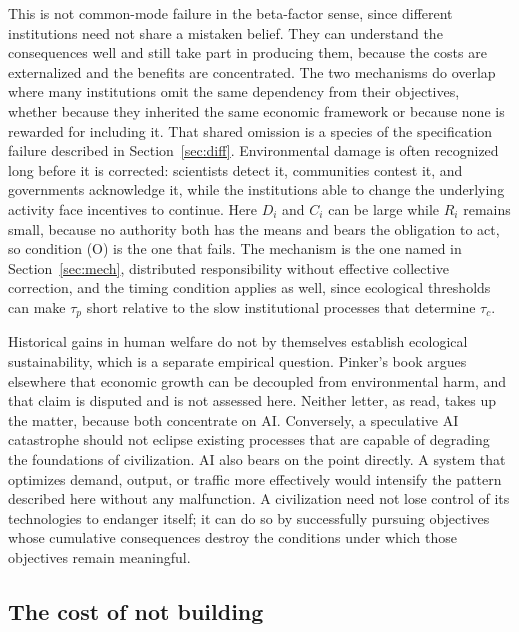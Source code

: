 \documentclass[11pt]{article}
\begin{document}
This is not common-mode failure in the beta-factor sense, since different institutions need not share a mistaken belief. They can understand the consequences well and still take part in producing them, because the costs are externalized and the benefits are concentrated. The two mechanisms do overlap where many institutions omit the same dependency from their objectives, whether because they inherited the same economic framework or because none is rewarded for including it. That shared omission is a species of the specification failure described in Section~\ref{sec:diff}. Environmental damage is often recognized long before it is corrected: scientists detect it, communities contest it, and governments acknowledge it, while the institutions able to change the underlying activity face incentives to continue. Here $D_i$ and $C_i$ can be large while $R_i$ remains small, because no authority both has the means and bears the obligation to act, so condition (O) is the one that fails. The mechanism is the one named in Section~\ref{sec:mech}, distributed responsibility without effective collective correction, and the timing condition applies as well, since ecological thresholds can make $\tau_p$ short relative to the slow institutional processes that determine $\tau_c$.

Historical gains in human welfare do not by themselves establish ecological sustainability, which is a separate empirical question. Pinker's book argues elsewhere that economic growth can be decoupled from environmental harm, and that claim is disputed and is not assessed here. Neither letter, as read, takes up the matter, because both concentrate on AI. Conversely, a speculative AI catastrophe should not eclipse existing processes that are capable of degrading the foundations of civilization. AI also bears on the point directly. A system that optimizes demand, output, or traffic more effectively would intensify the pattern described here without any malfunction. A civilization need not lose control of its technologies to endanger itself; it can do so by successfully pursuing objectives whose cumulative consequences destroy the conditions under which those objectives remain meaningful.

\subsection{The cost of not building}
\end{document}
